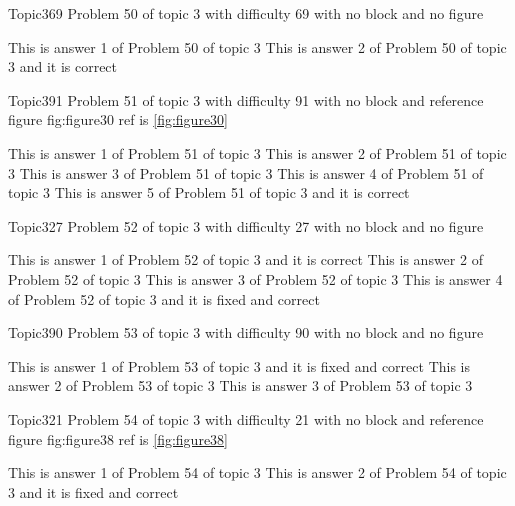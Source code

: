 \documentclass[master]{exam}
\begin{document}
\begin{problem}{Topic3}{69}
	Problem 50 of topic 3 with difficulty 69 with no block and no figure
	\begin{answers}
		\answer This is answer 1 of Problem 50 of topic 3 
		\answer[correct] This is answer 2 of Problem 50 of topic 3 and it is correct
	\end{answers}
\end{problem}

\begin{problem}{Topic3}{91}
	Problem 51 of topic 3 with difficulty 91 with no block and reference figure fig:figure30 ref is \ref{fig:figure30}
	\begin{answers}
		\answer This is answer 1 of Problem 51 of topic 3 
		\answer This is answer 2 of Problem 51 of topic 3 
		\answer This is answer 3 of Problem 51 of topic 3 
		\answer This is answer 4 of Problem 51 of topic 3 
		\answer[correct] This is answer 5 of Problem 51 of topic 3 and it is correct
	\end{answers}
\end{problem}

\begin{problem}{Topic3}{27}
	Problem 52 of topic 3 with difficulty 27 with no block and no figure
	\begin{answers}
		\answer[correct] This is answer 1 of Problem 52 of topic 3 and it is correct
		\answer This is answer 2 of Problem 52 of topic 3 
		\answer This is answer 3 of Problem 52 of topic 3 
		 This is answer 4 of Problem 52 of topic 3 and it is fixed and correct
	\end{answers}
\end{problem}

\begin{problem}{Topic3}{90}
	Problem 53 of topic 3 with difficulty 90 with no block and no figure
	\begin{answers}
		 This is answer 1 of Problem 53 of topic 3 and it is fixed and correct
		\answer This is answer 2 of Problem 53 of topic 3 
		\answer This is answer 3 of Problem 53 of topic 3 
	\end{answers}
\end{problem}

\begin{problem}{Topic3}{21}
	Problem 54 of topic 3 with difficulty 21 with no block and reference figure fig:figure38 ref is \ref{fig:figure38}
	\begin{answers}
		\answer This is answer 1 of Problem 54 of topic 3 
		 This is answer 2 of Problem 54 of topic 3 and it is fixed and correct
	\end{answers}
\end{problem}
\end{document}
